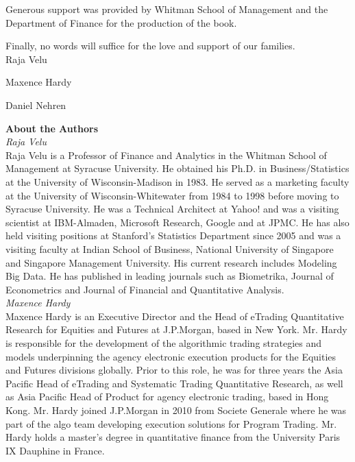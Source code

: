 Generous support was provided by Whitman School of Management and the Department of Finance for the production of the book. 


Finally, no words will suffice for the love and support of our families. \\[1cm]


\noindent Raja Velu \par
\noindent Maxence Hardy \par
\noindent Daniel Nehren



\newpage



{\noindent \Large\bfseries About the Authors} \\[0.2cm]


{\noindent\large\itshape Raja Velu} \\[0.2cm]
\noindent Raja Velu is a Professor of Finance and Analytics in the Whitman School of Management at Syracuse University. He obtained his Ph.D. in Business/Statistics at the University of Wisconsin-Madison in 1983. He served as a marketing faculty at the University of Wisconsin-Whitewater from 1984 to 1998 before moving to Syracuse University. He was a Technical Architect at Yahoo! and was a visiting scientist at IBM-Almaden, Microsoft Research, Google and at JPMC. He has also held visiting positions at Stanford's Statistics Department since 2005 and was a visiting faculty at Indian School of Business, National University of Singapore and Singapore Management University. His current research includes Modeling Big Data. He has published in leading journals such as Biometrika, Journal of Econometrics and Journal of Financial and Quantitative Analysis. \\


{\noindent\large\itshape Maxence Hardy} \\[0.2cm]
\noindent Maxence Hardy is an Executive Director and the Head of eTrading Quantitative Research for Equities and Futures at J.P.Morgan, based in New York. Mr. Hardy is responsible for the development of the algorithmic trading strategies and models underpinning the agency electronic execution products for the Equities and Futures divisions globally. Prior to this role, he was for three years the Asia Pacific Head of eTrading and Systematic Trading Quantitative Research, as well as Asia Pacific Head of Product for agency electronic trading, based in Hong Kong. Mr. Hardy joined J.P.Morgan in 2010 from Societe Generale where he was part of the algo team developing execution solutions for Program Trading. Mr. Hardy holds a master's degree in quantitative finance from the University Paris IX Dauphine in France. \\


